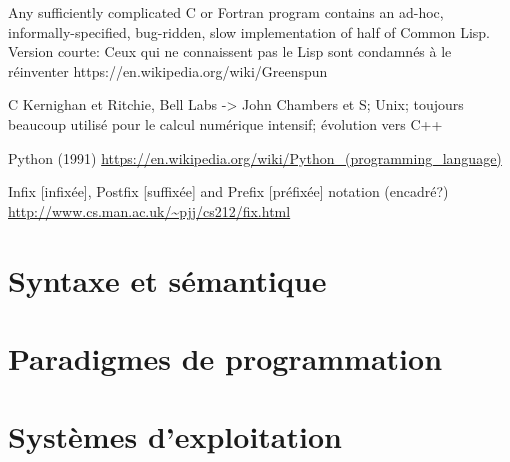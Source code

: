 Any sufficiently complicated C or Fortran program contains an ad-hoc,
informally-specified, bug-ridden, slow implementation of half of
Common Lisp.
Version courte: Ceux qui ne connaissent pas le Lisp sont condamnés à
le réinventer
https://en.wikipedia.org/wiki/Greenspun%


C Kernighan et Ritchie, Bell Labs -> John Chambers et S; Unix;
toujours beaucoup utilisé pour le calcul numérique intensif; évolution
vers C++

Python (1991)
\url{https://en.wikipedia.org/wiki/Python_(programming_language)}

Infix [infixée], Postfix [suffixée] and Prefix [préfixée] notation (encadré?)
\url{http://www.cs.man.ac.uk/~pjj/cs212/fix.html}






\section{Syntaxe et sémantique}
\label{sec:informatique:syntaxe}

\section{Paradigmes de programmation}
\label{sec:informatique:paradigmes}

\section{Systèmes d'exploitation}
\label{sec:informatique:os}



